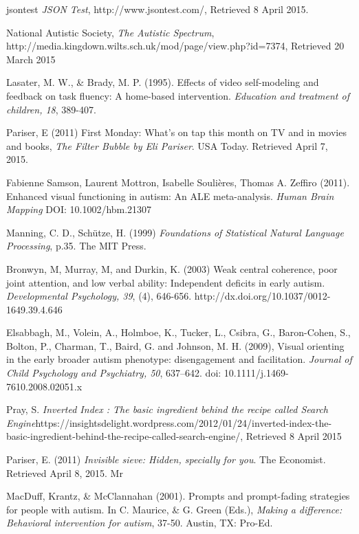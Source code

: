 \documentclass[a4paper, 10pt]{article}
\begin{document}
\begin{thebibliography}{100}
jsontest \textit{JSON Test}, http://www.jsontest.com/, Retrieved 8 April 2015.

National Autistic Society, \textit{The Autistic Spectrum}, \\http://media.kingdown.wilts.sch.uk/mod/page/view.php?id=7374, Retrieved 20 March 2015

Lasater, M. W., \& Brady, M. P. (1995). Effects of video self-modeling and feedback on task fluency: A home-based intervention. \textit{Education and treatment of children, 18}, 389-407.

 Pariser, E (2011) First Monday: What's on tap this month on TV and in movies and books, \textit{The Filter Bubble by Eli Pariser}. USA Today. Retrieved April 7, 2015. 

Fabienne Samson, Laurent Mottron, Isabelle Soulières, Thomas A. Zeffiro (2011). Enhanced visual functioning in autism: An ALE meta-analysis. \textit{Human Brain Mapping} DOI: 10.1002/hbm.21307

Manning, C. D., Schütze, H. (1999) \textit{Foundations of Statistical Natural Language Processing}, p.35. The MIT Press.

 Bronwyn, M, Murray, M, and Durkin, K. (2003) Weak central coherence, poor joint attention, and low verbal ability: Independent deficits in early autism. \textit{Developmental Psychology, 39}, (4), 646-656. http://dx.doi.org/10.1037/0012-1649.39.4.646

Elsabbagh, M., Volein, A., Holmboe, K., Tucker, L., Csibra, G., Baron-Cohen, S., Bolton, P., Charman, T., Baird, G. and Johnson, M. H. (2009), Visual orienting in the early broader autism phenotype: disengagement and facilitation. \textit{Journal of Child Psychology and Psychiatry, 50}, 637–642. doi: 10.1111/j.1469-7610.2008.02051.x

 Pray, S. \textit{Inverted Index : The basic ingredient behind the recipe called Search Engine}https://insightsdelight.wordpress.com/2012/01/24/inverted-index-the-basic-ingredient-behind-the-recipe-called-search-engine/, Retrieved 8 April 2015

 Pariser, E. (2011) \textit{Invisible sieve: Hidden, specially for you}. The Economist. Retrieved April 8, 2015. Mr 

 MacDuff, Krantz, \& McClannahan (2001). Prompts and prompt-fading strategies for people with autism. In C. Maurice, \& G. Green (Eds.), \textit{Making a difference: Behavioral intervention for autism}, 37-50. Austin, TX: Pro-Ed.


\end{thebibliography}
\end{document}
